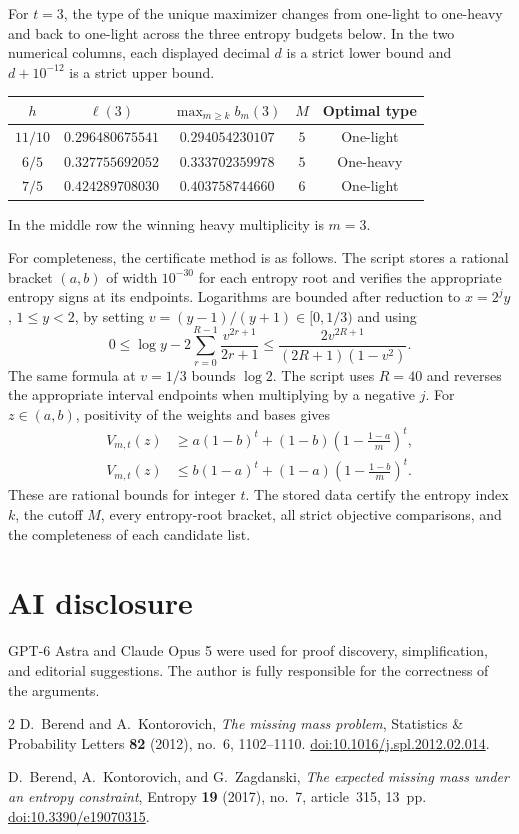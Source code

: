 \documentclass[11pt]{article}
\numberwithin{equation}{section}
\begin{document}
For $t=3$, the type of the unique maximizer changes from one-light to
one-heavy and back to one-light across the three entropy budgets below.
In the two numerical columns, each displayed decimal $d$ is a strict
lower bound and $d+10^{-12}$ is a strict upper bound.
\begin{center}
\begin{tabular}{c c c c c}
\toprule
$h$ & $\ell(3)$ & $\max_{m\ge k}b_m(3)$ & $M$ & Optimal type\\
\midrule
$11/10$ & $0.296480675541$ & $0.294054230107$ & $5$ & One-light\\
$6/5$   & $0.327755692052$ & $0.333702359978$ & $5$ & One-heavy\\
$7/5$   & $0.424289708030$ & $0.403758744660$ & $6$ & One-light\\
\bottomrule
\end{tabular}
\end{center}
In the middle row the winning heavy multiplicity is $m=3$.

For completeness, the certificate method is as follows. The script stores
a rational bracket $(a,b)$ of width $10^{-30}$ for each entropy root and
verifies the appropriate entropy signs at its endpoints. Logarithms are
bounded after reduction to $x=2^j y$, $1\le y<2$, by setting
$v=(y-1)/(y+1)\in[0,1/3)$ and using
\begin{equation}\label{eq:log-certificate}
 0\le\log y-2\sum_{r=0}^{R-1}\frac{v^{2r+1}}{2r+1}
 \le\frac{2v^{2R+1}}{(2R+1)(1-v^2)}.
\end{equation}
The same formula at $v=1/3$ bounds $\log2$. The script uses $R=40$ and
reverses the appropriate interval endpoints when multiplying by a
negative $j$. For $z\in(a,b)$, positivity of the weights and bases gives
\[
 \begin{aligned}
 V_{m,t}(z)&\ge a(1-b)^t
 +(1-b)\left(1-\frac{1-a}{m}\right)^t,\\
 V_{m,t}(z)&\le b(1-a)^t
 +(1-a)\left(1-\frac{1-b}{m}\right)^t.
 \end{aligned}
\]
These are rational bounds for integer $t$. The stored data certify the
entropy index $k$, the cutoff $M$, every entropy-root bracket, all strict
objective comparisons, and the completeness of each candidate list.

\section*{AI disclosure}
GPT-6 Astra and Claude Opus 5 were used for proof discovery, simplification,
and editorial suggestions. The author is fully responsible for the
correctness of the arguments.

\begin{thebibliography}{2}
 D.~Berend and A.~Kontorovich,
\emph{The missing mass problem},
Statistics \& Probability Letters \textbf{82} (2012), no.~6, 1102--1110.
\href{https://doi.org/10.1016/j.spl.2012.02.014}{doi:10.1016/j.spl.2012.02.014}.

 D.~Berend, A.~Kontorovich, and G.~Zagdanski,
\emph{The expected missing mass under an entropy constraint},
Entropy \textbf{19} (2017), no.~7, article~315, 13~pp.
\href{https://doi.org/10.3390/e19070315}{doi:10.3390/e19070315}.
\end{thebibliography}
\end{document}
